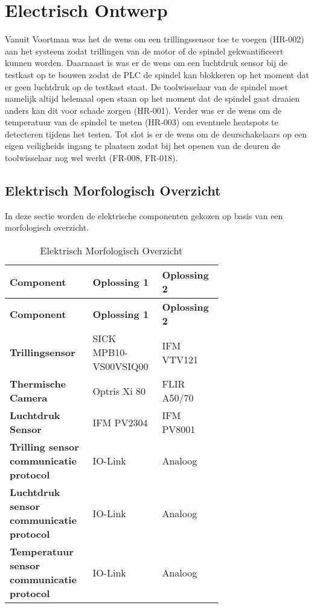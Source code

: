 \section{Electrisch Ontwerp}

Vanuit Voortman was het de wens om een trillingssensor toe te voegen (HR-002) aan het systeem zodat trillingen van de motor of de spindel gekwantificeert kunnen worden. Daarnaast is was er de wens om een luchtdruk sensor bij de testkast op te bouwen zodat de \gls{PLC} de spindel kan blokkeren op het moment dat er geen luchtdruk op de testkast staat. De toolwisselaar van de spindel moet namelijk altijd helemaal open staan op het moment dat de spindel gaat draaien anders kan dit voor schade zorgen (HR-001). Verder was er de wens om de temperatuur van de spindel te meten (HR-003) om eventuele heatspots te detecteren tijdens het testen. Tot slot is er de wens om de deurschakelaars op een eigen veiligheids ingang te plaatsen zodat bij het openen van de deuren de toolwisselaar nog wel werkt (FR-008, FR-018).

\subsection{Elektrisch Morfologisch Overzicht}

In deze sectie worden de elektrische componenten gekozen op basis van een morfologisch overzicht.

\begin{xltabular}{\linewidth}{|p{0.3\linewidth}|p{0.2\linewidth}|p{0.2\linewidth}|}
	\caption{Elektrisch Morfologisch Overzicht} \\
	\hline
	\textbf{Component} & \textbf{Oplossing 1} & \textbf{Oplossing 2} \\
	\hline
	\endfirsthead
	\hline
	\textbf{Component} & \textbf{Oplossing 1} & \textbf{Oplossing 2} \\
	\hline
	\endhead
	\hline
	\endfoot
	\hline
	\endlastfoot
	\textbf{Trillingsensor} &  SICK MPB10-VS00VSIQ00 & IFM VTV121 \\
	\hline
	\textbf{Thermische Camera} & Optris Xi 80 &  FLIR A50/70 \\
	\hline
	\textbf{Luchtdruk Sensor} &  IFM PV2304 & IFM PV8001 \\
	\hline
	\textbf{Trilling sensor communicatie protocol} &  IO-Link & Analoog \\
	\hline
	\textbf{Luchtdruk sensor communicatie protocol} &   IO-Link & Analoog \\
	\hline 
	\textbf{Temperatuur sensor communicatie protocol} &  IO-Link & Analoog \\
	\hline
\end{xltabular}

